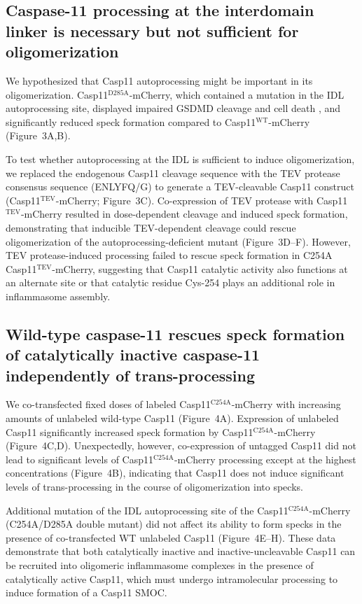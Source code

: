 \documentclass[11pt]{article}
\begin{document}
\subsection{Caspase-11 processing at the interdomain linker is necessary but not sufficient for oligomerization}

We hypothesized that Casp11 autoprocessing might be important in its oligomerization. Casp11$^{\text{D285A}}$-mCherry, which contained a mutation in the IDL autoprocessing site, displayed impaired GSDMD cleavage and cell death \citep{lee2018,ross2018}, and significantly reduced speck formation compared to Casp11$^{\text{WT}}$-mCherry (Figure~3A,B).

To test whether autoprocessing at the IDL is sufficient to induce oligomerization, we replaced the endogenous Casp11 cleavage sequence with the TEV protease consensus sequence (ENLYFQ/G) to generate a TEV-cleavable Casp11 construct (Casp11$^{\text{TEV}}$-mCherry; Figure~3C). Co-expression of TEV protease with Casp11$^{\text{TEV}}$-mCherry resulted in dose-dependent cleavage and induced speck formation, demonstrating that inducible TEV-dependent cleavage could rescue oligomerization of the autoprocessing-deficient mutant (Figure~3D--F). However, TEV protease-induced processing failed to rescue speck formation in C254A Casp11$^{\text{TEV}}$-mCherry, suggesting that Casp11 catalytic activity also functions at an alternate site or that catalytic residue Cys-254 plays an additional role in inflammasome assembly.

\subsection{Wild-type caspase-11 rescues speck formation of catalytically inactive caspase-11 independently of trans-processing}

We co-transfected fixed doses of labeled Casp11$^{\text{C254A}}$-mCherry with increasing amounts of unlabeled wild-type Casp11 (Figure~4A). Expression of unlabeled Casp11 significantly increased speck formation by Casp11$^{\text{C254A}}$-mCherry (Figure~4C,D). Unexpectedly, however, co-expression of untagged Casp11 did not lead to significant levels of Casp11$^{\text{C254A}}$-mCherry processing except at the highest concentrations (Figure~4B), indicating that Casp11 does not induce significant levels of trans-processing in the course of oligomerization into specks.

Additional mutation of the IDL autoprocessing site of the Casp11$^{\text{C254A}}$-mCherry (C254A/D285A double mutant) did not affect its ability to form specks in the presence of co-transfected WT unlabeled Casp11 (Figure~4E--H). These data demonstrate that both catalytically inactive and inactive-uncleavable Casp11 can be recruited into oligomeric inflammasome complexes in the presence of catalytically active Casp11, which must undergo intramolecular processing to induce formation of a Casp11 SMOC.
\end{document}
